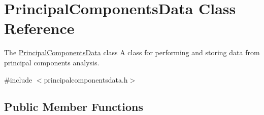 \hypertarget{class_principal_components_data}{\section{Principal\+Components\+Data Class Reference}
\label{class_principal_components_data}
}


The \hyperlink{class_principal_components_data}{Principal\+Components\+Data} class A class for performing and storing data from principal components analysis.  




{\ttfamily \#include $<$principalcomponentsdata.\+h$>$}

\subsection*{Public Member Functions}
